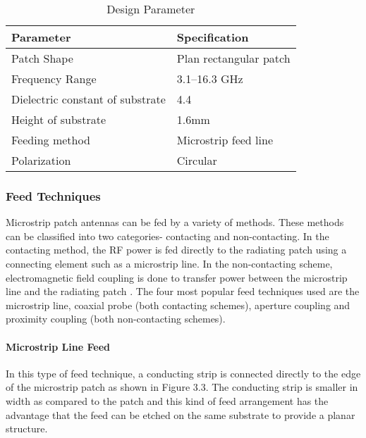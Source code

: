 \documentclass[12pt]{article}
\begin{document}
				                 \begin{center}
				                 		\begin{table}[H]
				                 			\centering
				                 			\begin{tabular}{ |l|l|}
				                 				\hline
				                 				Parameter & Specification \\ \hline
				                 				Patch Shape &  Plan rectangular patch \\ \hline
				                 				Frequency Range &  3.1–16.3 GHz \\ \hline
				                 				Dielectric constant of substrate & 4.4 \\ \hline
				                 				Height of substrate &   1.6mm \\ \hline
				                 				Feeding method &  Microstrip feed line \\ \hline
				                 				Polarization &  Circular \\ \hline			
				                 			\end{tabular}
				                 			\caption{Design Parameter}
				                 		\end{table}
				                 \end{center}
				                 
				                \subsubsection{Feed Techniques}
				                  \justify
				                   Microstrip patch antennas can be fed by a variety of methods. These methods can be
				                   classified into two categories- contacting and non-contacting. In the contacting method, the RF power is fed directly to the radiating patch using a connecting element such as a microstrip line. In the non-contacting scheme, electromagnetic field coupling is done to transfer power between the microstrip line and the radiating patch . The four most popular feed techniques used are the microstrip line, coaxial probe (both contacting schemes), aperture coupling and proximity coupling (both non-contacting schemes).
				                   
				                 \paragraph{ Microstrip Line Feed}
				                   \justify
				                    In this type of feed technique, a conducting strip is connected directly to the edge of the microstrip patch as shown in Figure 3.3. The conducting strip is smaller in width as compared to the patch and this kind of feed arrangement has the advantage that the feed can be etched on the same substrate to provide a planar structure.
				                    
\end{document}
